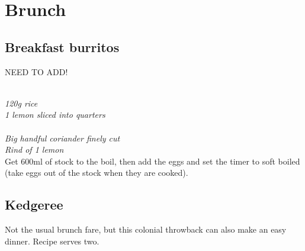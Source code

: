 \documentclass{tufte-book}
\begin{document}
\begin{figure}[p]
\hfill
{}
\end{figure}

\chapter{Brunch}

\section{Breakfast burritos}

NEED TO ADD!


\smallskip
{}
\\\emph{120g rice
\\1 lemon sliced into quarters
}
\\
\\\emph{Big handful coriander finely cut
\\Rind of 1 lemon
}
\smallskip
\\Get 600ml of stock to the boil, then add the eggs and set the timer to soft boiled (take eggs out of the stock when they are cooked).


\section{Kedgeree}

Not the usual brunch fare, but this colonial throwback can also make an easy dinner. Recipe serves two.
\end{document}
